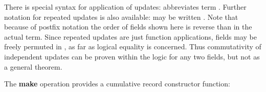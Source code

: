 \begin{isabellebody}
\begin{isamarkuptext}
  There is special syntax for application of updates:  abbreviates term .  Further notation for
  repeated updates is also available:  may be written .  Note that
  because of postfix notation the order of fields shown here is
  reverse than in the actual term.  Since repeated updates are just
  function applications, fields may be freely permuted in , as far as logical equality is concerned.
  Thus commutativity of independent updates can be proven within the
  logic for any two fields, but not as a general theorem.

  \medskip The \textbf{make} operation provides a cumulative record
  constructor function:


\end{isamarkuptext}
\end{isabellebody}
